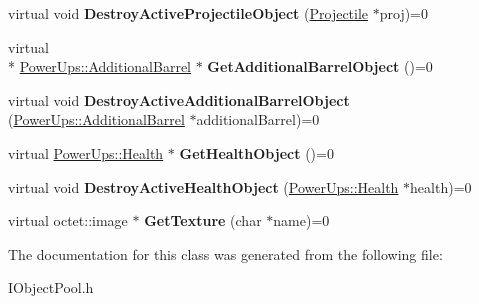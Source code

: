 \begin{DoxyCompactItemize}
\item 
\hypertarget{class_arena_1_1_i_object_pool_a58f864f408e886d6cde56b677978cb3b}{virtual void {\bfseries Destroy\+Active\+Projectile\+Object} (\hyperlink{class_arena_1_1_projectile}{Projectile} $\ast$proj)=0}\label{class_arena_1_1_i_object_pool_a58f864f408e886d6cde56b677978cb3b}

\item 
\hypertarget{class_arena_1_1_i_object_pool_a511dd6d3e9633d1021c462bab2b7c38c}{virtual \\*
\hyperlink{class_arena_1_1_power_ups_1_1_additional_barrel}{Power\+Ups\+::\+Additional\+Barrel} $\ast$ {\bfseries Get\+Additional\+Barrel\+Object} ()=0}\label{class_arena_1_1_i_object_pool_a511dd6d3e9633d1021c462bab2b7c38c}

\item 
\hypertarget{class_arena_1_1_i_object_pool_a049d60e093c117e6c4483066e69eb9d7}{virtual void {\bfseries Destroy\+Active\+Additional\+Barrel\+Object} (\hyperlink{class_arena_1_1_power_ups_1_1_additional_barrel}{Power\+Ups\+::\+Additional\+Barrel} $\ast$additional\+Barrel)=0}\label{class_arena_1_1_i_object_pool_a049d60e093c117e6c4483066e69eb9d7}

\item 
\hypertarget{class_arena_1_1_i_object_pool_a0d6345f00bfb1a68ab8403e674a2775a}{virtual \hyperlink{class_arena_1_1_power_ups_1_1_health}{Power\+Ups\+::\+Health} $\ast$ {\bfseries Get\+Health\+Object} ()=0}\label{class_arena_1_1_i_object_pool_a0d6345f00bfb1a68ab8403e674a2775a}

\item 
\hypertarget{class_arena_1_1_i_object_pool_a6598dfd19eb777d4f8f3d8c5c2141ac0}{virtual void {\bfseries Destroy\+Active\+Health\+Object} (\hyperlink{class_arena_1_1_power_ups_1_1_health}{Power\+Ups\+::\+Health} $\ast$health)=0}\label{class_arena_1_1_i_object_pool_a6598dfd19eb777d4f8f3d8c5c2141ac0}

\item 
\hypertarget{class_arena_1_1_i_object_pool_acfd5e01aaacc3e3939573b1a9e3ccd26}{virtual octet\+::image $\ast$ {\bfseries Get\+Texture} (char $\ast$name)=0}\label{class_arena_1_1_i_object_pool_acfd5e01aaacc3e3939573b1a9e3ccd26}

\end{DoxyCompactItemize}


The documentation for this class was generated from the following file\+:\begin{DoxyCompactItemize}
\item 
I\+Object\+Pool.\+h\end{DoxyCompactItemize}
